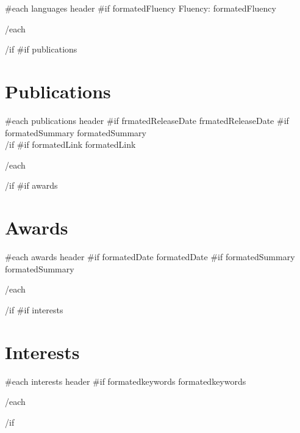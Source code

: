 \documentclass{article}
{{ markdownPackage }}
\begin{document}
\begin{paracol}{2}
\begin{leftcolumn*}
{  {{#each languages}}
    {{ header }}\newline
    {{#if formatedFluency}} Fluency: {{ formatedFluency }}
    \par
  {{/each}}
}{{/if}}
{{#if publications}}\section*{Publications}{
  {{#each publications}}
    {{ header }}\newline
    {{#if frmatedReleaseDate}}{{ frmatedReleaseDate }}
    {{#if formatedSummary}}
      {{ formatedSummary }}
      \\
    {{/if}}
    {{#if formatedLink}}{{ formatedLink }}
    \par
  {{/each}}
}{{/if}}
{{#if awards}}\section*{Awards}{
  {{#each awards}}
    {{ header }}\newline
    {{#if formatedDate}}{{ formatedDate }}
    {{#if formatedSummary}}{{ formatedSummary }}
    \par
  {{/each}}
}{{/if}}
{{#if interests}}\section*{Interests}{
  {{#each interests}}
    {{ header }}\newline
    {{#if formatedkeywords}}{{ formatedkeywords }}
    \par
  {{/each}}
}{{/if}}

\end{leftcolumn*}


\end{paracol}
\end{document}
